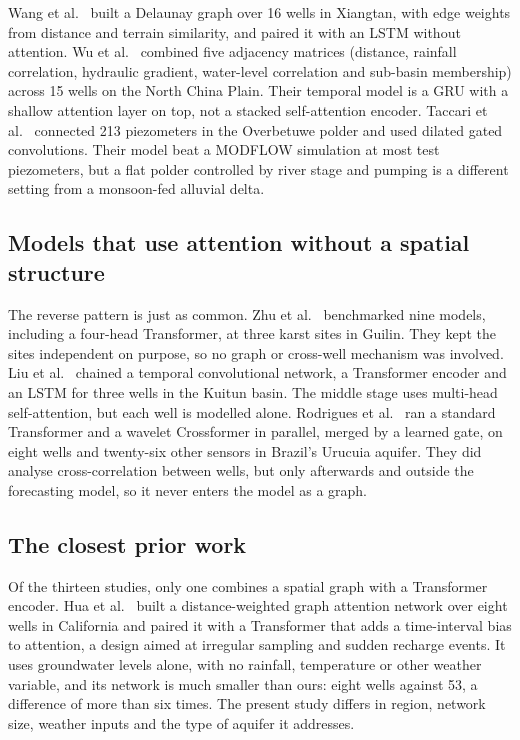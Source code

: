 \documentclass[conference]{IEEEtran}
\begin{document}
Wang et al.~\cite{ref6} built a Delaunay graph over 16 wells in Xiangtan, with edge weights from distance and terrain similarity, and paired it with an LSTM without attention. Wu et al.~\cite{ref7} combined five adjacency matrices (distance, rainfall correlation, hydraulic gradient, water-level correlation and sub-basin membership) across 15 wells on the North China Plain. Their temporal model is a GRU with a shallow attention layer on top, not a stacked self-attention encoder. Taccari et al.~\cite{ref8} connected 213 piezometers in the Overbetuwe polder and used dilated gated convolutions. Their model beat a MODFLOW simulation at most test piezometers, but a flat polder controlled by river stage and pumping is a different setting from a monsoon-fed alluvial delta.

\subsection{Models that use attention without a spatial structure}

The reverse pattern is just as common. Zhu et al.~\cite{ref9} benchmarked nine models, including a four-head Transformer, at three karst sites in Guilin. They kept the sites independent on purpose, so no graph or cross-well mechanism was involved. Liu et al.~\cite{ref10} chained a temporal convolutional network, a Transformer encoder and an LSTM for three wells in the Kuitun basin. The middle stage uses multi-head self-attention, but each well is modelled alone. Rodrigues et al.~\cite{ref11} ran a standard Transformer and a wavelet Crossformer in parallel, merged by a learned gate, on eight wells and twenty-six other sensors in Brazil's Urucuia aquifer. They did analyse cross-correlation between wells, but only afterwards and outside the forecasting model, so it never enters the model as a graph.

\subsection{The closest prior work}

Of the thirteen studies, only one combines a spatial graph with a Transformer encoder. Hua et al.~\cite{ref2} built a distance-weighted graph attention network over eight wells in California and paired it with a Transformer that adds a time-interval bias to attention, a design aimed at irregular sampling and sudden recharge events. It uses groundwater levels alone, with no rainfall, temperature or other weather variable, and its network is much smaller than ours: eight wells against 53, a difference of more than six times. The present study differs in region, network size, weather inputs and the type of aquifer it addresses.
\end{document}
